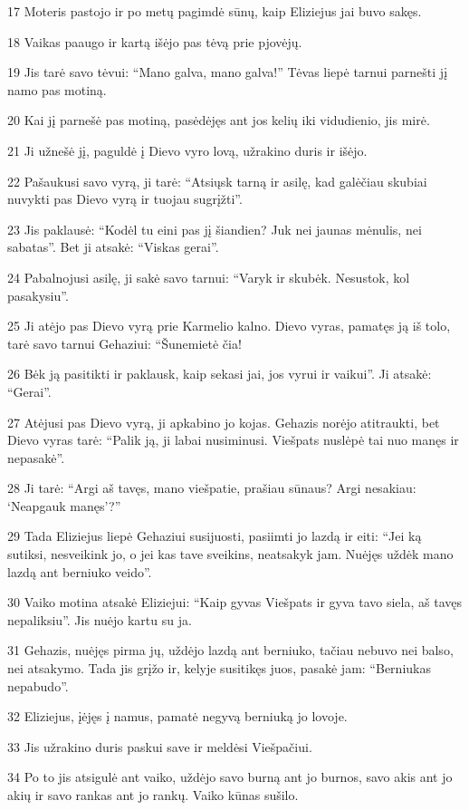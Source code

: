 \par 17 Moteris pastojo ir po metų pagimdė sūnų, kaip Eliziejus jai buvo sakęs. 
\par 18 Vaikas paaugo ir kartą išėjo pas tėvą prie pjovėjų. 
\par 19 Jis tarė savo tėvui: “Mano galva, mano galva!” Tėvas liepė tarnui parnešti jį namo pas motiną. 
\par 20 Kai jį parnešė pas motiną, pasėdėjęs ant jos kelių iki vidudienio, jis mirė. 
\par 21 Ji užnešė jį, paguldė į Dievo vyro lovą, užrakino duris ir išėjo. 
\par 22 Pašaukusi savo vyrą, ji tarė: “Atsiųsk tarną ir asilę, kad galėčiau skubiai nuvykti pas Dievo vyrą ir tuojau sugrįžti”. 
\par 23 Jis paklausė: “Kodėl tu eini pas jį šiandien? Juk nei jaunas mėnulis, nei sabatas”. Bet ji atsakė: “Viskas gerai”. 
\par 24 Pabalnojusi asilę, ji sakė savo tarnui: “Varyk ir skubėk. Nesustok, kol pasakysiu”. 
\par 25 Ji atėjo pas Dievo vyrą prie Karmelio kalno. Dievo vyras, pamatęs ją iš tolo, tarė savo tarnui Gehaziui: “Šunemietė čia! 
\par 26 Bėk ją pasitikti ir paklausk, kaip sekasi jai, jos vyrui ir vaikui”. Ji atsakė: “Gerai”. 
\par 27 Atėjusi pas Dievo vyrą, ji apkabino jo kojas. Gehazis norėjo atitraukti, bet Dievo vyras tarė: “Palik ją, ji labai nusiminusi. Viešpats nuslėpė tai nuo manęs ir nepasakė”. 
\par 28 Ji tarė: “Argi aš tavęs, mano viešpatie, prašiau sūnaus? Argi nesakiau: ‘Neapgauk manęs’?” 
\par 29 Tada Eliziejus liepė Gehaziui susijuosti, pasiimti jo lazdą ir eiti: “Jei ką sutiksi, nesveikink jo, o jei kas tave sveikins, neatsakyk jam. Nuėjęs uždėk mano lazdą ant berniuko veido”. 
\par 30 Vaiko motina atsakė Eliziejui: “Kaip gyvas Viešpats ir gyva tavo siela, aš tavęs nepaliksiu”. Jis nuėjo kartu su ja. 
\par 31 Gehazis, nuėjęs pirma jų, uždėjo lazdą ant berniuko, tačiau nebuvo nei balso, nei atsakymo. Tada jis grįžo ir, kelyje susitikęs juos, pasakė jam: “Berniukas nepabudo”. 
\par 32 Eliziejus, įėjęs į namus, pamatė negyvą berniuką jo lovoje. 
\par 33 Jis užrakino duris paskui save ir meldėsi Viešpačiui. 
\par 34 Po to jis atsigulė ant vaiko, uždėjo savo burną ant jo burnos, savo akis ant jo akių ir savo rankas ant jo rankų. Vaiko kūnas sušilo. 
